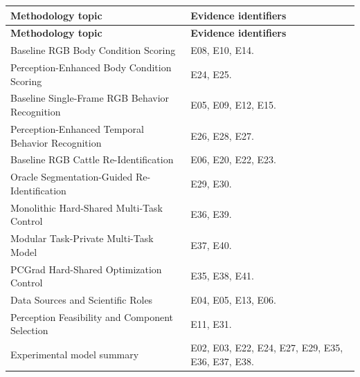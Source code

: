 \begin{longtable}{@{}p{9.2cm}p{4.7cm}@{}}
\toprule
\textbf{Methodology topic} & \textbf{Evidence identifiers}\\
\midrule
\endfirsthead
\toprule
\textbf{Methodology topic} & \textbf{Evidence identifiers}\\
\midrule
\endhead
Baseline RGB Body Condition Scoring & E08, E10, E14.\\
Perception-Enhanced Body Condition Scoring & E24, E25.\\
Baseline Single-Frame RGB Behavior Recognition & E05, E09, E12, E15.\\
Perception-Enhanced Temporal Behavior Recognition & E26, E28, E27.\\
Baseline RGB Cattle Re-Identification & E06, E20, E22, E23.\\
Oracle Segmentation-Guided Re-Identification & E29, E30.\\
Monolithic Hard-Shared Multi-Task Control & E36, E39.\\
Modular Task-Private Multi-Task Model & E37, E40.\\
PCGrad Hard-Shared Optimization Control & E35, E38, E41.\\
Data Sources and Scientific Roles & E04, E05, E13, E06.\\
Perception Feasibility and Component Selection & E11, E31.\\
Experimental model summary & E02, E03, E22, E24, E27, E29, E35, E36, E37, E38.\\
\bottomrule
\end{longtable}
